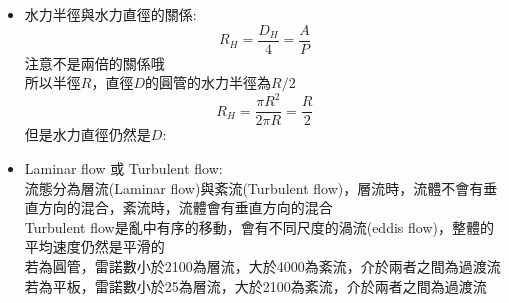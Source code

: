 \documentclass[../main.tex]{subfiles}
\begin{document}
\begin{itemize}
\begin{figure}[H]
      \caption{水力直徑示意圖}
      \label{fig:hydraulic_diameter}
    \end{figure}
    左圖為方管:
    \begin{equation}
      D_H = \frac{4A}{P} = \frac{4ab}{2(a+b)} = \frac{2ab}{a+b}
    \end{equation}
    中圖為平板間隙，假設一距離$x$($x$會被削掉):
    \begin{equation}
      D_H = \frac{4A}{P} = \frac{4bx}{2x} = 2b
    \end{equation}
    因為沒有邊，所以周常不考慮邊的長度\\
    右圖為環管:
    \begin{equation}
      D_H = \frac{4A}{P} = \frac{4\pi\left(\frac{D_2^2-D_1^2}{4}\right)}{\pi(D_2+D_1)} = \frac{D_2^2-D_1^2}{D_2+D_1} = D_2 - D_1
    \end{equation}
    可看出，環管的水力直徑等於外徑減內徑
  \item 水力半徑與水力直徑的關係:
    \begin{equation}
      R_H = \frac{D_H}{4} = \frac{A}{P}
    \end{equation}
    注意不是兩倍的關係哦\\
    所以半徑$R$，直徑$D$的圓管的水力半徑為$R/2$
    \begin{equation}
      R_H = \frac{\pi R^2}{2\pi R} = \frac{R}{2}
    \end{equation}
    但是水力直徑仍然是$D$:
  \item Laminar flow 或 Turbulent flow:\\
    流態分為層流(Laminar flow)與紊流(Turbulent flow)，層流時，流體不會有垂直方向的混合，紊流時，流體會有垂直方向的混合\\
    Turbulent flow是亂中有序的移動，會有不同尺度的渦流(eddis flow)，整體的平均速度仍然是平滑的\\
    若為圓管，雷諾數小於2100為層流，大於4000為紊流，介於兩者之間為過渡流\\
    若為平板，雷諾數小於25為層流，大於2100為紊流，介於兩者之間為過渡流
\end{itemize}
\end{document}
